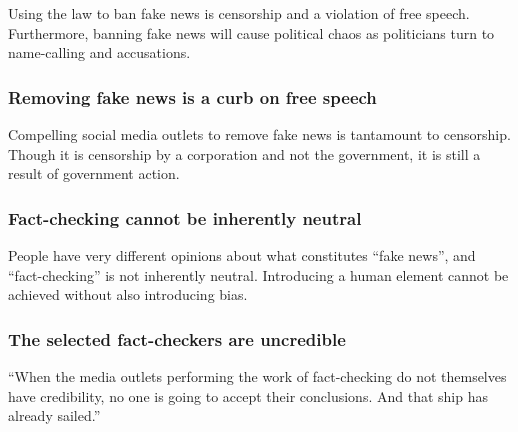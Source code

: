 \par Using the law to ban fake news is censorship and a violation of free speech. Furthermore, banning fake news will cause political chaos as politicians turn to name-calling and accusations. \cite{eff_cali_bill_distrastrous}

\subsubsection{Removing fake news is a curb on free speech}

\par Compelling social media outlets to remove fake news is tantamount to censorship. Though it is censorship by a corporation and not the government, it is still a result of government action. \cite{wp_germany_fake_news_law}

\subsubsection{Fact-checking cannot be inherently neutral}

\par People have very different opinions about what constitutes ``fake news'', and ``fact-checking'' is not inherently neutral. Introducing a human element cannot be achieved without also introducing bias. \cite{vox_sentences_fn}

\subsubsection{The selected fact-checkers are uncredible}

\par ``When the media outlets performing the work of fact-checking do not themselves have credibility, no one is going to accept their conclusions. And that ship has already sailed.'' \cite{vox_sentences_fn}

%
\vfill